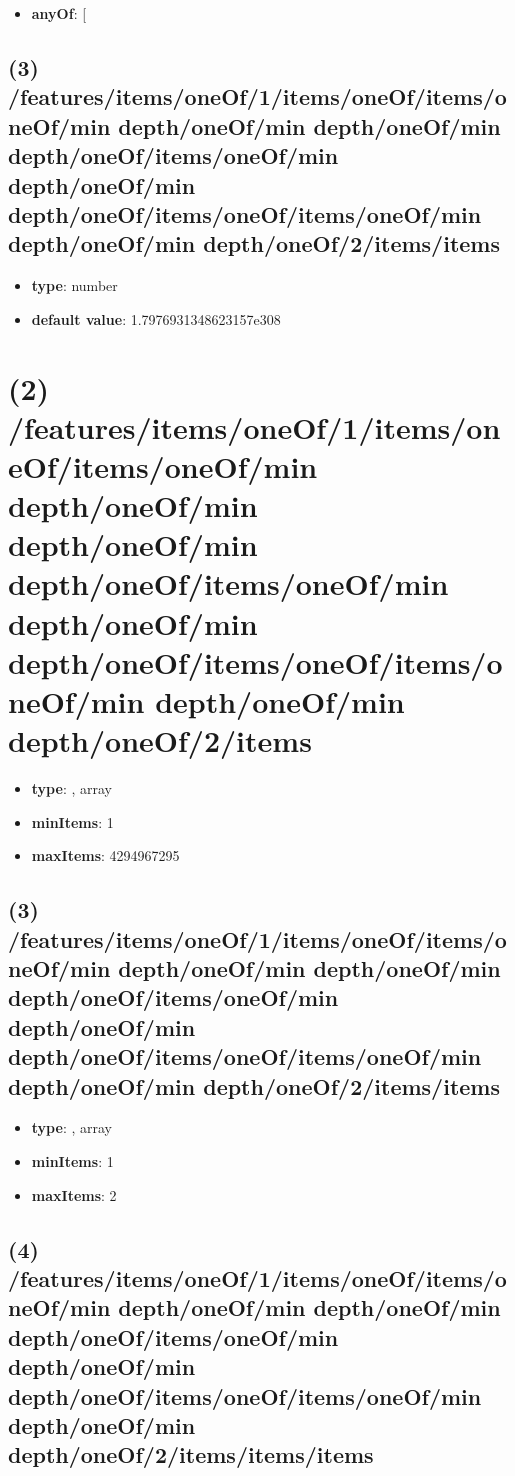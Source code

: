 \begin{itemize}[leftmargin=3em]\item {\bf anyOf}: [\end{itemize}\subsection{(3) /features/items/oneOf/1/items/oneOf/items/oneOf/min depth/oneOf/min depth/oneOf/min depth/oneOf/items/oneOf/min depth/oneOf/min depth/oneOf/items/oneOf/items/oneOf/min depth/oneOf/min depth/oneOf/2/items/items}
\begin{itemize}[leftmargin=3em]\item {\bf type}: number\item {\bf default value}: 1.7976931348623157e308
\end{itemize}\section{(2) /features/items/oneOf/1/items/oneOf/items/oneOf/min depth/oneOf/min depth/oneOf/min depth/oneOf/items/oneOf/min depth/oneOf/min depth/oneOf/items/oneOf/items/oneOf/min depth/oneOf/min depth/oneOf/2/items}
\begin{itemize}[leftmargin=2em]\item {\bf type}: , array\item {\bf minItems}: 1
\item {\bf maxItems}: 4294967295
\end{itemize}\subsection{(3) /features/items/oneOf/1/items/oneOf/items/oneOf/min depth/oneOf/min depth/oneOf/min depth/oneOf/items/oneOf/min depth/oneOf/min depth/oneOf/items/oneOf/items/oneOf/min depth/oneOf/min depth/oneOf/2/items/items}
\begin{itemize}[leftmargin=3em]\item {\bf type}: , array\item {\bf minItems}: 1
\item {\bf maxItems}: 2
\end{itemize}\subsection{(4) /features/items/oneOf/1/items/oneOf/items/oneOf/min depth/oneOf/min depth/oneOf/min depth/oneOf/items/oneOf/min depth/oneOf/min depth/oneOf/items/oneOf/items/oneOf/min depth/oneOf/min depth/oneOf/2/items/items/items}
